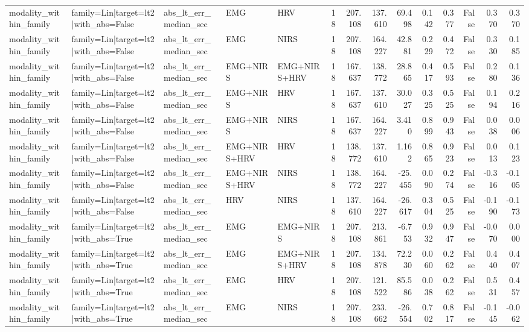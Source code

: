 \begin{table}
\begin{tabular}{lllllrrrrrrrrr}
modality_within_family & family=Lin|target=lt2|with_abs=False & abs_lt_err_median_sec & EMG & HRV & 18 & 207.108 & 137.610 & 69.498 & 0.142 & 0.377 & False & 0.370 & 0.370 \\
modality_within_family & family=Lin|target=lt2|with_abs=False & abs_lt_err_median_sec & EMG & NIRS & 18 & 207.108 & 164.227 & 42.881 & 0.229 & 0.472 & False & 0.330 & 0.185 \\
modality_within_family & family=Lin|target=lt2|with_abs=False & abs_lt_err_median_sec & EMG+NIRS & EMG+NIRS+HRV & 18 & 167.637 & 138.772 & 28.865 & 0.417 & 0.593 & False & 0.280 & 0.136 \\
modality_within_family & family=Lin|target=lt2|with_abs=False & abs_lt_err_median_sec & EMG+NIRS & HRV & 18 & 167.637 & 137.610 & 30.027 & 0.325 & 0.525 & False & 0.194 & 0.216 \\
modality_within_family & family=Lin|target=lt2|with_abs=False & abs_lt_err_median_sec & EMG+NIRS & NIRS & 18 & 167.637 & 164.227 & 3.410 & 0.899 & 0.943 & False & 0.038 & 0.006 \\
modality_within_family & family=Lin|target=lt2|with_abs=False & abs_lt_err_median_sec & EMG+NIRS+HRV & HRV & 18 & 138.772 & 137.610 & 1.162 & 0.865 & 0.923 & False & 0.013 & 0.123 \\
modality_within_family & family=Lin|target=lt2|with_abs=False & abs_lt_err_median_sec & EMG+NIRS+HRV & NIRS & 18 & 138.772 & 164.227 & -25.455 & 0.090 & 0.274 & False & -0.316 & -0.105 \\
modality_within_family & family=Lin|target=lt2|with_abs=False & abs_lt_err_median_sec & HRV & NIRS & 18 & 137.610 & 164.227 & -26.617 & 0.304 & 0.525 & False & -0.190 & -0.173 \\
modality_within_family & family=Lin|target=lt2|with_abs=True & abs_lt_err_median_sec & EMG & EMG+NIRS & 18 & 207.108 & 213.861 & -6.753 & 0.932 & 0.947 & False & -0.070 & 0.000 \\
modality_within_family & family=Lin|target=lt2|with_abs=True & abs_lt_err_median_sec & EMG & EMG+NIRS+HRV & 18 & 207.108 & 134.878 & 72.230 & 0.060 & 0.262 & False & 0.440 & 0.407 \\
modality_within_family & family=Lin|target=lt2|with_abs=True & abs_lt_err_median_sec & EMG & HRV & 18 & 207.108 & 121.522 & 85.586 & 0.038 & 0.262 & False & 0.531 & 0.457 \\
modality_within_family & family=Lin|target=lt2|with_abs=True & abs_lt_err_median_sec & EMG & NIRS & 18 & 207.108 & 233.662 & -26.554 & 0.702 & 0.817 & False & -0.145 & -0.062 \\

\end{tabular}
\end{table}
